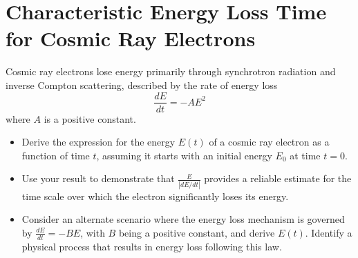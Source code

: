 \section{Characteristic Energy Loss Time for Cosmic Ray Electrons}

Cosmic ray electrons lose energy primarily through synchrotron radiation and inverse Compton scattering, described by the rate of energy loss \[\frac{dE}{dt} = -A E^2\] where \(A\) is a positive constant.

\begin{itemize}
\item Derive the expression for the energy \(E(t)\) of a cosmic ray electron as a function of time \(t\), assuming it starts with an initial energy \(E_0\) at time \(t = 0\).
\item Use your result to demonstrate that \( \frac{E}{\left| dE/dt \right|} \) provides a reliable estimate for the time scale over which the electron significantly loses its energy.
\item Consider an alternate scenario where the energy loss mechanism is governed by \(\frac{dE}{dt} = -B E\), with \(B\) being a positive constant, and derive \( E(t) \). Identify a physical process that results in energy loss following this law.
\end{itemize}
